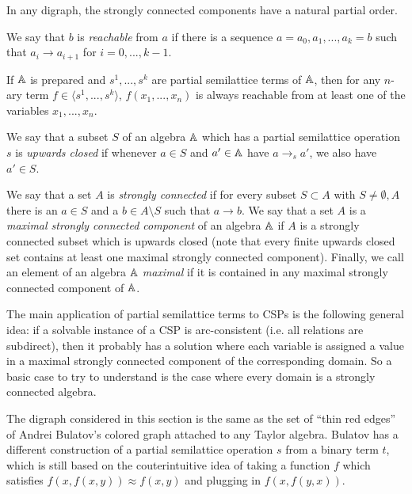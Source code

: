 \documentclass[letterpaper,11pt]{article}
\begin{document}
In any digraph, the strongly connected components have a natural partial order.

\begin{defn} We say that $b$ is \emph{reachable} from $a$ if there is a sequence $a = a_0, a_1, ..., a_k = b$ such that $a_i \rightarrow a_{i+1}$ for $i = 0, ..., k-1$.
\end{defn}

\begin{prop} If $\mathbb{A}$ is prepared and $s^1, ..., s^k$ are partial semilattice terms of $\mathbb{A}$, then for any $n$-ary term $f \in \langle s^1, ..., s^k\rangle$, $f(x_1, ..., x_n)$ is always reachable from at least one of the variables $x_1, ..., x_n$.
\end{prop}

\begin{defn} We say that a subset $S$ of an algebra $\mathbb{A}$ which has a partial semilattice operation $s$ is \emph{upwards closed} if whenever $a\in S$ and $a' \in \mathbb{A}$ have $a \rightarrow_s a'$, we also have $a' \in S$.
\end{defn}

\begin{defn} We say that a set $A$ is \emph{strongly connected} if for every subset $S \subset A$ with $S\ne \emptyset, A$ there is an $a \in S$ and a $b \in A\setminus S$ such that $a \rightarrow b$. We say that a set $A$ is a \emph{maximal strongly connected component} of an algebra $\mathbb{A}$ if $A$ is a strongly connected subset which is upwards closed (note that every finite upwards closed set contains at least one maximal strongly connected component). Finally, we call an element of an algebra $\mathbb{A}$ \emph{maximal} if it is contained in any maximal strongly connected component of $\mathbb{A}$.
\end{defn}

The main application of partial semilattice terms to CSPs is the following general idea: if a solvable instance of a CSP is arc-consistent (i.e. all relations are subdirect), then it probably has a solution where each variable is assigned a value in a maximal strongly connected component of the corresponding domain. So a basic case to try to understand is the case where every domain is a strongly connected algebra.

\begin{rem} The digraph considered in this section is the same as the set of ``thin red edges'' of Andrei Bulatov's colored graph \cite{colored-graph} attached to any Taylor algebra. Bulatov has a different construction of a partial semilattice operation $s$ from a binary term $t$, which is still based on the couterintuitive idea of taking a function $f$ which satisfies $f(x,f(x,y)) \approx f(x,y)$ and plugging in $f(x,f(y,x))$.
\end{rem}
\end{document}
